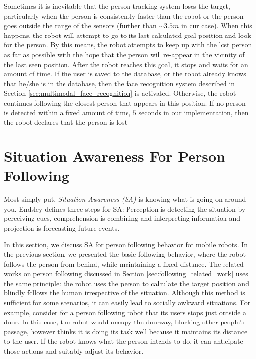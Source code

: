 Sometimes it is inevitable that the person tracking system loses the target, particularly when the person is consistently faster than the robot or the person goes outside the range of the sensors (further than $\sim3.5m$ in our case). When this happens, the robot will attempt to go to its last calculated goal position and look for the person. By this means, the robot attempts to keep up with the lost person as far as possible with the hope that the person will re-appear in the vicinity of the last seen position. After the robot reaches this goal, it stops and waits for an amount of time. If the user is saved to the database, or the robot already knows that he/she is in the database, then the face recognition system described in Section \ref{sec:multimodal_face_recognition} is activated. Otherwise, the robot continues following the closest person that appears in this position. If no person is detected within a fixed amount of time, $5$ seconds in our implementation, then the robot declares that the person is lost.


\section{Situation Awareness For Person Following}
\label{sec:following_situation_aware}

Most simply put, \textit{Situation Awareness (SA)} is knowing what is going on around you. Endsley \cite{endsley2000situation} defines three steps for SA: Perception is detecting the situation by perceiving cues, comprehension is combining and interpreting information and projection is forecasting future events.

In this section, we discuss SA for person following behavior for mobile robots. In the previous section, we presented the basic following behavior, where the robot follows the person from behind, while maintaining a fixed distance. The related works on person following discussed in Section \ref{sec:following_related_work} uses the same principle: the robot uses the person to calculate the target position and blindly follows the human irrespective of the situation. Although this method is sufficient for some scenarios, it can easily lead to socially awkward situations. For example, consider for a person following robot that its users stops just outside a door. In this case, the robot would occupy the doorway, blocking other people's passage, however thinks it is doing its task well because it maintains its distance to the user. If the robot knows what the person intends to do, it can anticipate those actions and suitably adjust its behavior.

